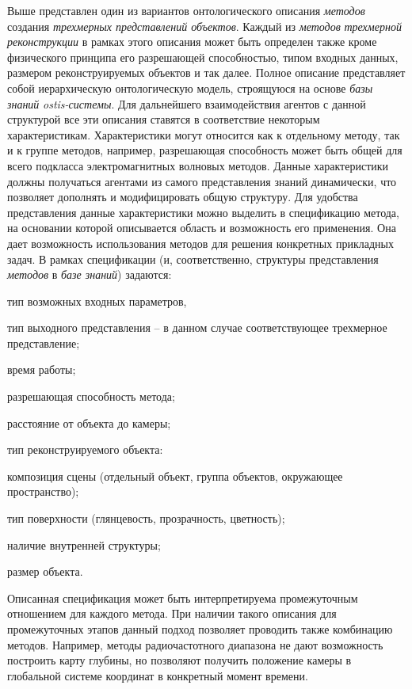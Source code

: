 Выше представлен один из вариантов онтологического описания \textit{методов} создания \textit{трехмерных представлений объектов}. Каждый из \textit{методов} \textit{трехмерной реконструкции} в рамках этого описания может быть определен также кроме физического принципа его разрешающей способностью, типом входных данных, размером реконструируемых объектов и так далее. Полное описание представляет собой иерархическую онтологическую модель, строящуюся на основе \textit{базы знаний} \textit{ostis-системы}. Для дальнейшего взаимодействия агентов с данной структурой все эти описания ставятся в соответствие некоторым характеристикам. Характеристики могут относится как к отдельному методу, так и к группе методов, например, разрешающая способность может быть общей для всего подкласса электромагнитных волновых методов. Данные характеристики должны получаться агентами из самого представления знаний динамически, что позволяет дополнять и модифицировать общую структуру.
Для удобства представления данные характеристики можно выделить в спецификацию метода, на основании которой описывается область и возможность его применения. Она дает возможность использования методов для решения конкретных прикладных задач. В рамках спецификации (и, соответственно, структуры представления \textit{методов} в \textit{базе знаний}) задаются:
\begin{textitemize}
    \item тип возможных входных параметров,
    \item тип выходного представления -- в данном случае соответствующее трехмерное представление;
    \item время работы;
    \item разрешающая способность метода;
    \item расстояние от объекта до камеры;
    \item тип реконструируемого объекта:
    \item композиция сцены (отдельный объект, группа объектов, окружающее пространство);
    \item тип поверхности (глянцевость, прозрачность, цветность);
    \item наличие внутренней структуры;
    \item размер объекта.
\end{textitemize}

Описанная спецификация может быть интерпретируема промежуточным отношением для каждого метода. При наличии такого описания для промежуточных этапов данный подход позволяет проводить также комбинацию методов. Например, методы радиочастотного диапазона не дают возможность построить карту глубины, но позволяют получить положение камеры в глобальной системе координат в конкретный момент времени.

